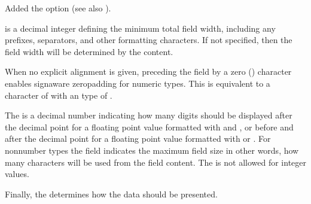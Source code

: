 \documentclass[letterpaper,10pt,english]{sphinxmanual}
\begin{document}
Added the \sphinxcode{\sphinxupquote{\textquotesingle{}\_\textquotesingle{}}} option (see also ).

 is a decimal integer defining the minimum total field width,
including any prefixes, separators, and other formatting characters.
If not specified, then the field width will be determined by the content.

When no explicit alignment is given, preceding the  field by a zero
(\sphinxcode{\sphinxupquote{\textquotesingle{}0\textquotesingle{}}}) character enables
sign\sphinxhyphen{}aware zero\sphinxhyphen{}padding for numeric types.  This is equivalent to a 
character of \sphinxcode{\sphinxupquote{\textquotesingle{}0\textquotesingle{}}} with an  type of \sphinxcode{\sphinxupquote{\textquotesingle{}=\textquotesingle{}}}.

The  is a decimal number indicating how many digits should be
displayed after the decimal point for a floating point value formatted with
 and , or before and after the decimal point for a floating point
value formatted with  or .  For non\sphinxhyphen{}number types the field
indicates the maximum field size \sphinxhyphen{} in other words, how many characters will be
used from the field content. The  is not allowed for integer values.

Finally, the  determines how the data should be presented.
\end{document}
